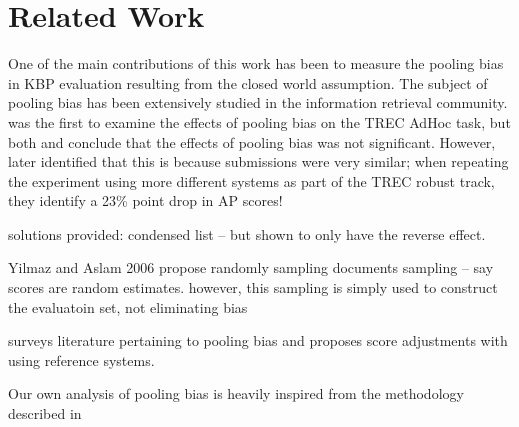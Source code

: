 \section{Related Work}
\label{sec:related}

One of the main contributions of this work has been to measure the pooling bias in KBP evaluation resulting from the closed world assumption.
The subject of pooling bias has been extensively studied in the information retrieval community.
\citep{zobel1998reliable} was the first to examine the effects of pooling bias on the TREC AdHoc task, but 
both \citet{zobel1998reliable} and \citet{voorhees199overview} conclude that the effects of pooling bias was not significant.
However, \citet{buckley2007bias} later identified that this is because submissions were very similar; when repeating the experiment using more different systems as part of the TREC robust track, they identify a 23\% point drop in AP scores!

solutions provided:
condensed list -- but shown to only have the reverse effect.

Yilmaz and Aslam 2006 propose randomly sampling documents sampling -- say scores are random estimates.
however, this sampling is simply used to construct the evaluatoin set, not eliminating bias


\citet{weber2010measurement} surveys literature pertaining to pooling bias and proposes score adjustments with using reference systems.

Our own analysis of pooling bias is heavily inspired from the methodology described in 





% 
% 
% 
% 

